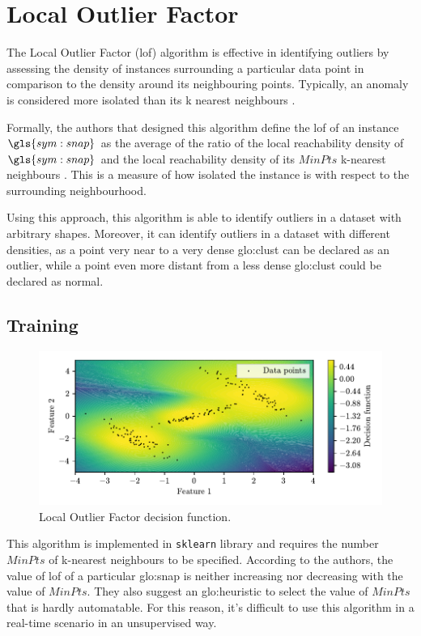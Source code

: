 \section{Local Outlier Factor}
\label{sec:LocalOutlierFactor}


The Local Outlier Factor (\gls{lof}) algorithm is effective in identifying outliers by assessing the density of instances surrounding a particular data point in comparison to the density around its neighbouring points. Typically, an anomaly is considered more isolated than its k nearest neighbours . 

Formally, the authors that designed this algorithm define the \gls{lof} of an instance $\gls{sym:snap}$ as the average of the ratio of the local reachability density of $\gls{sym:snap}$ and the local reachability density of its $MinPts$ k-nearest neighbours \cite{breunig2000lof}. This is a measure of how isolated the instance is with respect to the surrounding neighbourhood. 

Using this approach, this algorithm is able to identify outliers in a dataset with arbitrary shapes. Moreover, it can identify outliers in a dataset with different densities, as a point very near to a very dense \gls{glo:clust} can be declared as an outlier, while a point even more distant from a less dense \gls{glo:clust} could be declared as normal.

\subsection{Training}
\label{sec:lof_train}
\begin{figure}
    \centering
    \includegraphics{images/LOF/Figure_1.pdf}
    \caption{Local Outlier Factor decision function.}
    \label{fig:LocalOutlierFactor}
\end{figure}
This algorithm is implemented in \texttt{sklearn} library and requires the number $MinPts$ of k-nearest neighbours to be specified. According to the authors, the value of \gls{lof} of a particular \gls{glo:snap} is neither increasing nor decreasing with the value of $MinPts$. They also suggest an \gls{glo:heuristic} to select the value of $MinPts$ that is hardly automatable. 
For this reason, it's difficult to use this algorithm in a real-time scenario in an unsupervised way.

